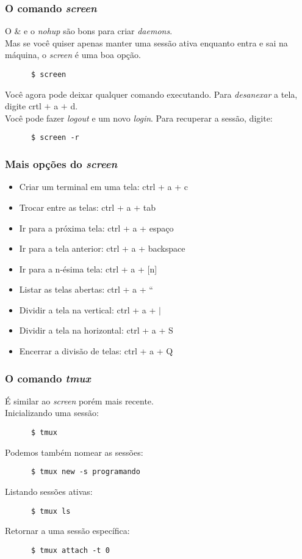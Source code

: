 \documentclass{beamer}
\begin{document}
   \begin{frame}[fragile]
      \frametitle{O comando \textit{screen}}
      O \& e o \textit{nohup} são bons para criar \textit{daemons}.\\
      Mas se você quiser apenas manter uma sessão ativa enquanto entra e sai na máquina, o \textit{screen} é uma boa opção. 
      \begin{verbatim}	   
      $ screen   
      \end{verbatim}	       
      Você agora pode deixar qualquer comando executando. Para \textit{desanexar} a tela, digite crtl $+$ a $+$ d. \\
      Você pode fazer \textit{logout} e um novo \textit{login}. Para recuperar a sessão, digite: 
      \begin{verbatim}	   
      $ screen -r
      \end{verbatim}
\end{frame}

   \begin{frame}
      \frametitle{Mais opções do \textit{screen}}
      \begin{itemize}
         \item Criar um terminal em uma tela: ctrl + a + c 
         \item Trocar entre as telas: ctrl + a + tab 
         \item Ir para a próxima tela: ctrl + a + espaço 
         \item Ir para a tela anterior: ctrl + a + backspace 
         \item Ir para a n-ésima tela: ctrl + a + [n] 
         \item Listar as telas abertas: ctrl + a + \textquotedblleft 
         \item Dividir a tela na vertical: ctrl + a + $|$ 
         \item Dividir a tela na horizontal: ctrl + a + S 
         \item Encerrar a divisão de telas: ctrl + a + Q 
      \end{itemize}
   \end{frame}

   \begin{frame}[fragile]
      \frametitle{O comando \textit{tmux}}
      É similar ao \textit{screen} porém mais recente. \\ 
      Inicializando uma sessão:
      \begin{verbatim}
      $ tmux	      
      \end{verbatim}
      Podemos também nomear as sessões:
      \begin{verbatim}
      $ tmux new -s programando	      
      \end{verbatim}
      Listando sessões ativas:
      \begin{verbatim}
      $ tmux ls
      \end{verbatim}
      Retornar a uma sessão específica:
      \begin{verbatim}
      $ tmux attach -t 0 
      \end{verbatim}
\end{frame}
\end{document}
